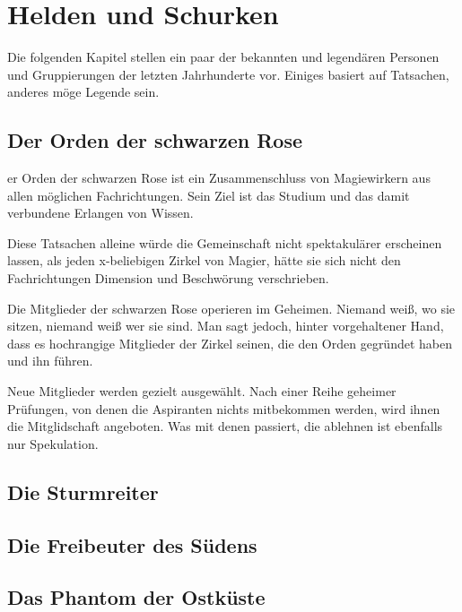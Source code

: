 \section{Helden und Schurken}
\label{heldenundschurken}
\par Die folgenden Kapitel stellen ein paar der bekannten und
legendären Personen und Gruppierungen der letzten Jahrhunderte vor.
Einiges basiert auf Tatsachen, anderes möge Legende sein.

\subsection{Der Orden der schwarzen Rose}
er Orden der schwarzen Rose ist ein Zusammenschluss von
Magiewirkern aus allen möglichen Fachrichtungen. Sein Ziel ist das
Studium und das damit verbundene Erlangen von Wissen.
\par Diese Tatsachen alleine würde die Gemeinschaft nicht
spektakulärer erscheinen lassen, als jeden x-beliebigen Zirkel von
Magier, hätte sie sich nicht den Fachrichtungen Dimension und
Beschwörung verschrieben.
\par Die Mitglieder der schwarzen Rose operieren im Geheimen.
Niemand weiß, wo sie sitzen, niemand weiß wer sie sind. Man sagt
jedoch, hinter vorgehaltener Hand, dass es hochrangige Mitglieder der
Zirkel seinen, die den Orden gegründet haben und ihn führen.
\par Neue Mitglieder werden gezielt ausgewählt. Nach einer Reihe
geheimer Prüfungen, von denen die Aspiranten nichts mitbekommen
werden, wird ihnen die Mitglidschaft angeboten. Was mit denen
passiert, die ablehnen ist ebenfalls nur Spekulation.

\subsection{Die Sturmreiter}

\subsection{Die Freibeuter des Südens}

\subsection{Das Phantom der Ostküste}

